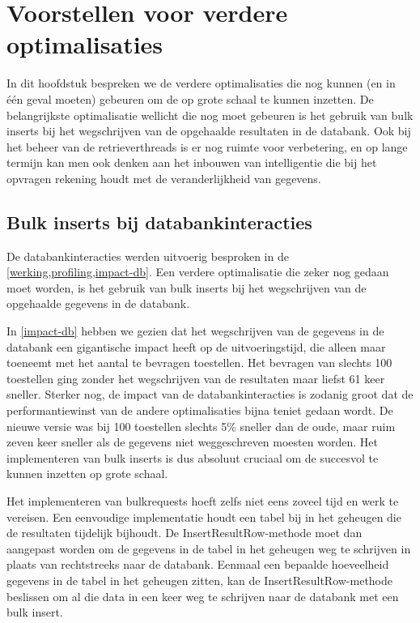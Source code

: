 \chapter{Voorstellen voor verdere optimalisaties}

In dit hoofdstuk bespreken we de verdere optimalisaties die nog kunnen (en in één geval moeten) gebeuren om de \nwmretriever{} op grote schaal te kunnen inzetten.
De belangrijkste optimalisatie wellicht die nog moet gebeuren is het gebruik van bulk inserts bij het wegschrijven van de opgehaalde resultaten in de databank.
Ook bij het beheer van de retrieverthreads is er nog ruimte voor verbetering,
en op lange termijn kan men ook denken aan het inbouwen van intelligentie die bij het opvragen rekening houdt met de veranderlijkheid van gegevens.


\section{Bulk inserts bij databankinteracties}

De databankinteracties werden uitvoerig besproken in de \cref{werking,profiling,impact-db}.
Een verdere optimalisatie die zeker nog gedaan moet worden,
is het gebruik van bulk inserts bij het wegschrijven van de opgehaalde gegevens in de databank.

In \cref{impact-db} hebben we gezien dat het wegschrijven van de gegevens in de databank een gigantische impact heeft op de uitvoeringstijd,
die alleen maar toeneemt met het aantal te bevragen toestellen.
Het bevragen van slechts 100 toestellen ging zonder het wegschrijven van de resultaten maar liefst 61 keer sneller.
Sterker nog, de impact van de databankinteracties is zodanig groot dat de performantiewinst van de andere optimalisaties bijna teniet gedaan wordt.
De nieuwe versie was bij 100 toestellen slechts 5\% sneller dan de oude, maar ruim zeven keer sneller als de gegevens niet weggeschreven moesten worden.
Het implementeren van bulk inserts is dus absoluut cruciaal om de \nwmretriever{} succesvol te kunnen inzetten op grote schaal.

Het implementeren van bulkrequests hoeft zelfs niet eens zoveel tijd en werk te vereisen.{}
Een eenvoudige implementatie houdt een tabel bij in het geheugen die de resultaten tijdelijk bijhoudt.
De InsertResultRow-methode moet dan aangepast worden om de gegevens in de tabel in het geheugen weg te schrijven in plaats van rechtstreeks naar de databank.
Eenmaal een bepaalde hoeveelheid gegevens in de tabel in het geheugen zitten, kan de InsertResultRow-methode beslissen om al die data
in een keer weg te schrijven naar de databank met een bulk insert.

